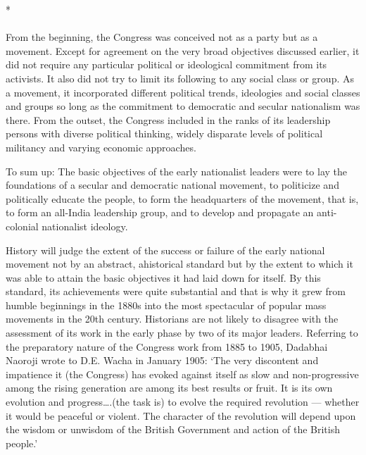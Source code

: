 \begin{center}*\end{center}

\paragraph*{}

From the beginning, the Congress was conceived not as a party but as a movement. Except for agreement on the very broad objectives discussed earlier, it did not require any particular political or ideological commitment from its activists. It also did not try to limit its following to any social class or group. As a movement, it incorporated different political trends, ideologies and social classes and groups so long as the commitment to democratic and secular nationalism was there. From the outset, the Congress included in the ranks of its leadership persons with diverse political thinking, widely disparate levels of political militancy and varying economic approaches.

To sum up: The basic objectives of the early nationalist leaders were to lay the foundations of a secular and democratic national movement, to politicize and politically educate the people, to form the headquarters of the movement, that is, to form an all-India leadership group, and to develop and propagate an anti-colonial nationalist ideology.

History will judge the extent of the success or failure of the early national movement not by an abstract, ahistorical standard but by the extent to which it was able to attain the basic objectives it had laid down for itself. By this standard, its achievements were quite substantial and that is why it grew from humble beginnings in the 1880s into the most spectacular of popular mass movements in the 20th century. Historians are not likely to disagree with the assessment of its work in the early phase by two of its major leaders. Referring to the preparatory nature of the Congress work from 1885 to 1905, Dadabhai Naoroji wrote to D.E. Wacha in January 1905: `The very discontent and impatience it (the Congress) has evoked against itself as slow and non-progressive among the rising generation are among its best results or fruit. It is its own evolution and progress….(the task is) to evolve the required revolution --- whether it would be peaceful or violent. The character of the revolution will depend upon the wisdom or unwisdom of the British Government and action of the British people.'

